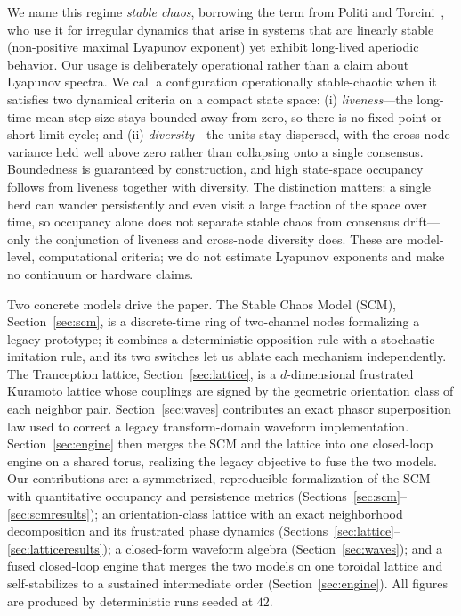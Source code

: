 \documentclass[11pt]{article}
\begin{document}
We name this regime \emph{stable chaos}, borrowing the term from Politi and Torcini~\cite{politi2010}, who use it
for irregular dynamics that arise in systems that are linearly stable (non-positive maximal Lyapunov exponent) yet
exhibit long-lived aperiodic behavior. Our usage is deliberately operational rather than a claim about Lyapunov
spectra. We call a configuration operationally stable-chaotic when it satisfies two dynamical criteria on a compact
state space: (i) \emph{liveness}---the long-time mean step size stays bounded away from zero, so there is no fixed
point or short limit cycle; and (ii) \emph{diversity}---the units stay dispersed, with the cross-node variance held
well above zero rather than collapsing onto a single consensus. Boundedness is guaranteed by construction, and high
state-space occupancy follows from liveness together with diversity. The distinction matters: a single herd can
wander persistently and even visit a large fraction of the space over time, so occupancy alone does not separate
stable chaos from consensus drift---only the conjunction of liveness and cross-node diversity does. These are
model-level, computational criteria; we do not estimate Lyapunov exponents and make no continuum or hardware claims.

Two concrete models drive the paper. The Stable Chaos Model (SCM), Section~\ref{sec:scm}, is a discrete-time ring
of two-channel nodes formalizing a legacy prototype; it combines a deterministic opposition rule with a stochastic
imitation rule, and its two switches let us ablate each mechanism independently. The Tranception lattice,
Section~\ref{sec:lattice}, is a $d$-dimensional frustrated Kuramoto lattice whose couplings are signed by the
geometric orientation class of each neighbor pair. Section~\ref{sec:waves} contributes an exact phasor superposition
law used to correct a legacy transform-domain waveform implementation. Section~\ref{sec:engine} then merges the SCM and
the lattice into one closed-loop engine on a shared torus, realizing the legacy objective to fuse the two models. Our
contributions are: a symmetrized, reproducible formalization of the SCM with quantitative occupancy and persistence
metrics (Sections~\ref{sec:scm}--\ref{sec:scmresults}); an orientation-class lattice with an exact neighborhood
decomposition and its frustrated phase dynamics (Sections~\ref{sec:lattice}--\ref{sec:latticeresults}); a closed-form
waveform algebra (Section~\ref{sec:waves}); and a fused closed-loop engine that merges the two models on one toroidal
lattice and self-stabilizes to a sustained intermediate order (Section~\ref{sec:engine}). All figures are produced by
deterministic runs seeded at $42$.
\end{document}

